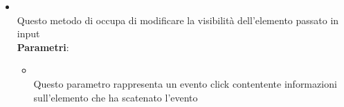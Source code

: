 \begin{itemize}
\begin{itemize}
\begin{itemize}
\end{itemize}
\item {}
\\ Questo metodo di occupa di modificare la visibilità dell'elemento passato in input
\\ \textbf{Parametri}:
\begin{itemize}
\item {}
\\ Questo parametro rappresenta un evento click contentente informazioni sull'elemento che ha scatenato l'evento
\end{itemize}
\end{itemize}
\end{itemize}

\label{\nogloxy{swedesigner::client::view::NewCellView}}
